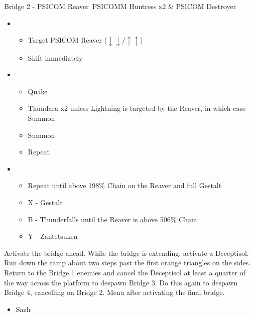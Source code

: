 \begin{multicols}{2}
  \begin{battle}{Bridge 2 - PSICOM Reaver\, PSICOMM Huntress x2 \& PSICOM Destroyer}%
    \begin{itemize}
      \item \first
            \begin{itemize}
              \item Target PSICOM Reaver ($\downarrow\downarrow/\uparrow\uparrow$)
              \item Shift immediately
            \end{itemize}
      \item \second
            \begin{itemize}
              \item Quake
              \item Thundara x2 unless Lightning is targeted by the Reaver, in which case Summon
              \item Summon
              \item Repeat
            \end{itemize}
      \item \fourth
            \begin{itemize}
              \item Repeat until above 198\% Chain on the Reaver and full Gestalt
              \item X - Gestalt
              \item B - Thunderfalls until the Reaver is above 506\% Chain
              \item Y - Zantetsuken
            \end{itemize}
    \end{itemize}
       
  \end{battle}
  Activate the bridge ahead. While the bridge is extending, activate a Deceptisol.  Run down the ramp about two steps past the first orange triangles on the sides. Return to the Bridge 1 enemies and cancel the Deceptisol at least a quarter of the way across the platform to despawn Bridge 3. Do this again to despawn Bridge 4, cancelling on Bridge 2. Menu after activating the final bridge.
  \begin{menu}
    \begin{itemize}
      \crystarium
      \begin{itemize}
        \item Sazh
              \begin{itemize}

\end{itemize}
\end{itemize}
\end{itemize}
\end{menu}
\end{multicols}
